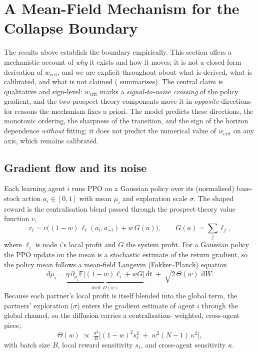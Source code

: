 \documentclass[11pt]{article}
\newcommand{\wcrit}{w_{\mathrm{crit}}}
\begin{document}
\section{A Mean-Field Mechanism for the Collapse Boundary}
\label{sec:meanfield}

The results above establish the boundary empirically. This section offers a
mechanistic account of \emph{why} it exists and how it moves; it is not a
closed-form derivation of $\wcrit$, and we are explicit throughout about
what is derived, what is calibrated, and what is not claimed
( summarises). The central claim is qualitative and
sign-level: $\wcrit$ marks a \emph{signal-to-noise crossing} of the policy
gradient, and the two prospect-theory components move it in \emph{opposite}
directions for reasons the mechanism fixes a priori. The model predicts
these directions, the monotonic ordering, the sharpness of the transition,
and the sign of the horizon dependence \emph{without} fitting; it does not
predict the numerical value of $\wcrit$ on any axis, which remains
calibrated.

\subsection{Gradient flow and its noise}
Each learning agent $i$ runs PPO on a Gaussian policy over its (normalised)
base-stock action $a_i\in[0,1]$ with mean $\mu_i$ and exploration scale
$\sigma$. The shaped reward is the centralisation blend passed through the
prospect-theory value function $v$,
\begin{equation}
  r_i = v\!\big((1-w)\,\ell_i(a_i,a_{-i}) + w\,G(a)\big),
  \qquad G(a)=\textstyle\sum_j \ell_j ,
  \label{eq:blend}
\end{equation}
where $\ell_i$ is node $i$'s local profit and $G$ the system profit. For a
Gaussian policy the PPO update on the mean is a stochastic estimate of the
return gradient, so the policy mean follows a mean-field Langevin
(Fokker--Planck) equation
\begin{equation}
  \mathrm{d}\mu_i = \underbrace{\eta\,\partial_{\mu_i}\mathbb{E}\big[(1{-}w)\ell_i + wG\big]}_{\text{drift } D(w)}\,\mathrm{d}t
  \;+\; \sqrt{2\,\Theta(w)}\;\mathrm{d}W .
  \label{eq:langevin}
\end{equation}
Because each partner's local profit is itself blended into the global term,
the partners' exploration ($\sigma$) enters the gradient estimate of agent
$i$ through the global channel, so the diffusion carries a centralisation-
weighted, cross-agent piece,
\begin{equation}
  \Theta(w)\;\propto\;\tfrac{\sigma^2}{B}\big[(1{-}w)^2 s_\ell^2 \;+\; w^2 (N{-}1)\,\kappa^2\big],
  \label{eq:diffusion}
\end{equation}
with batch size $B$, local reward sensitivity $s_\ell$, and cross-agent
sensitivity $\kappa$.
\end{document}

